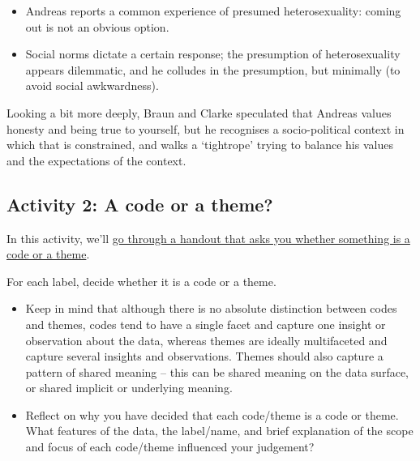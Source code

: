\documentclass[
  english,
  letterpaper,
  DIV=11,
  numbers=noendperiod]{scrreprt}
\providecommand{\tightlist}{%
  \setlength{\itemsep}{0pt}\setlength{\parskip}{0pt}}
\begin{document}
\begin{tcolorbox}[enhanced jigsaw, breakable, bottomtitle=1mm, leftrule=.75mm, opacityback=0, colbacktitle=quarto-callout-caution-color!10!white, opacitybacktitle=0.6, toprule=.15mm, colback=white, left=2mm, coltitle=black, bottomrule=.15mm, titlerule=0mm, title={Show me Braun \& Clarke's familiarisation notes}, toptitle=1mm, colframe=quarto-callout-caution-color-frame, arc=.35mm, rightrule=.15mm]

\begin{itemize}
\tightlist
\item
  Andreas reports a common experience of presumed heterosexuality:
  coming out is not an obvious option.
\item
  Social norms dictate a certain response; the presumption of
  heterosexuality appears dilemmatic, and he colludes in the
  presumption, but minimally (to avoid social awkwardness).
\end{itemize}

Looking a bit more deeply, Braun and Clarke speculated that Andreas
values honesty and being true to yourself, but he recognises a
socio-political context in which that is constrained, and walks a
`tightrope' trying to balance his values and the expectations of the
context.

\end{tcolorbox}

\subsection{Activity 2: A code or a
theme?}\label{activity-2-a-code-or-a-theme}

In this activity, we'll
\href{https://gla-my.sharepoint.com/:w:/g/personal/ashley_robertson_glasgow_ac_uk/EchyMtm_oPxJjdf87kLvpyMB3nyxnSof5oEP-0A-PhnEGg?e=YKqeo8}{go
through a handout that asks you whether something is a code or a theme}.

For each label, decide whether it is a code or a theme.

\begin{itemize}
\tightlist
\item
  Keep in mind that although there is no absolute distinction between
  codes and themes, codes tend to have a single facet and capture one
  insight or observation about the data, whereas themes are ideally
  multifaceted and capture several insights and observations. Themes
  should also capture a pattern of shared meaning -- this can be shared
  meaning on the data surface, or shared implicit or underlying meaning.
\item
  Reflect on why you have decided that each code/theme is a code or
  theme. What features of the data, the label/name, and brief
  explanation of the scope and focus of each code/theme influenced your
  judgement?
\end{itemize}
\end{document}
